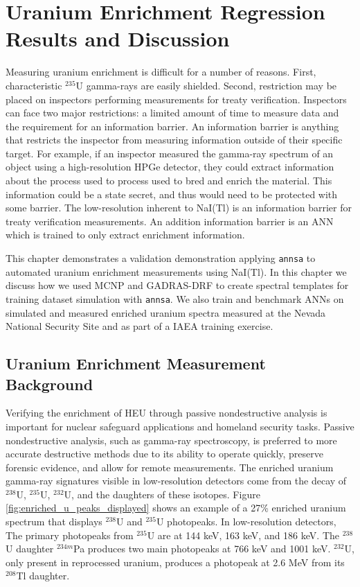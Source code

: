 \chapter[Uranium Enrichment Regression \newline Results and Discussion]{Uranium Enrichment Regression Results and Discussion} \label{uranium-enrichment}

Measuring uranium enrichment is difficult for a number of reasons. First, characteristic $^{235}$U gamma-rays are easily shielded. Second, restriction may be placed on inspectors performing measurements for treaty verification. Inspectors can face two major restrictions: a limited amount of time to measure data and the requirement for an information barrier. An information barrier is anything that restricts the inspector from measuring information outside of their specific target. For example, if an inspector measured the gamma-ray spectrum of an object using a high-resolution HPGe detector, they could extract information about the process used to process used to bred and enrich the material. This information could be a state secret, and thus would need to be protected with some barrier. The low-resolution inherent to NaI(Tl) is an information barrier for treaty verification measurements. An addition information barrier is an ANN which is trained to only extract enrichment information. 

This chapter demonstrates a validation demonstration applying \verb|annsa| to automated uranium enrichment measurements using NaI(Tl). In this chapter we discuss how we used MCNP and GADRAS-DRF to create spectral templates for training dataset simulation with \verb|annsa|. We also train and benchmark ANNs on simulated and measured enriched uranium spectra measured at the Nevada National Security Site and as part of a IAEA training exercise.


\section{Uranium Enrichment Measurement Background}

Verifying the enrichment of HEU through passive nondestructive analysis is important for nuclear safeguard applications and homeland security tasks. Passive nondestructive analysis, such as gamma-ray spectroscopy, is preferred to more accurate destructive methods due to its ability to operate quickly, preserve forensic evidence, and allow for remote measurements. The enriched uranium gamma-ray signatures visible in low-resolution detectors come from the decay of $^{238}$U, $^{235}$U, $^{232}$U, and the daughters of these isotopes. Figure \ref{fig:enriched_u_peaks_displayed} shows an example of a 27\% enriched uranium spectrum that displays $^{238}$U and $^{235}$U photopeaks. In low-resolution detectors, The primary photopeaks from $^{235}$U are at 144 keV, 163 keV, and 186 keV. The $^{238}$U daughter $^{234m}$Pa produces two main photopeaks at 766 keV and 1001 keV. $^{232}$U, only present in reprocessed uranium, produces a photopeak at 2.6 MeV from its $^{208}$Tl daughter.

